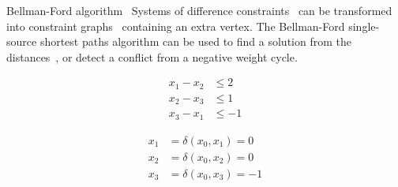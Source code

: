 \documentclass{beamer}
\begin{document}
\begin{frame}[fragile,t]
\begin{columns}[t,onlytextwidth]
\begin{column}{0.485\textwidth}
		\begin{block}{Bellman-Ford algorithm~\cite{CLRS}}
			Systems of difference constraints~ can be transformed into constraint graphs~ containing an extra vertex. The Bellman-Ford single-source shortest paths algorithm can be used to find a solution from the distances~, or detect a conflict from a negative weight cycle.
			\vspace*{-1em}
			\begin{figure}[h]
				\centering
				\begin{subfigure}[t]{0.3\linewidth}
					\centering
					\begin{align*}
						x_1 - x_2 &\leq 2 \\
						x_2 - x_3 &\leq 1 \\
						x_3 - x_1 &\leq -1
					\end{align*}
					\label{subfig:constraints}
				\end{subfigure}
				\begin{subfigure}[t]{0.4\linewidth}
					\centering
					\label{subfig:graph}
				\end{subfigure}
				\begin{subfigure}[t]{0.2\linewidth}
					\centering
					\begin{align*}
						x_1 &= \delta(x_0, x_1) = 0 \\
						x_2 &= \delta(x_0, x_2) = 0 \\
						x_3 &= \delta(x_0, x_3) = -1
					\end{align*}
					\label{subfig:solution}
				\end{subfigure}
			\end{figure}
			\vspace*{-1.5em}


\end{block}
\end{column}
\end{columns}
\end{frame}
\end{document}
